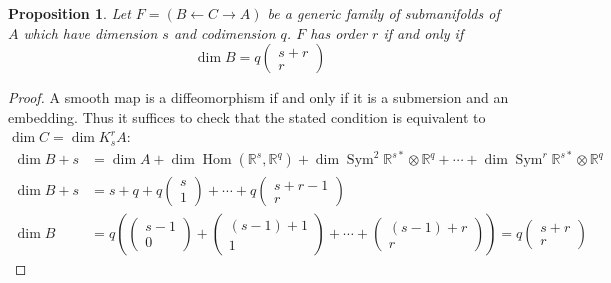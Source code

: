 \documentclass[12pt]{article}
\numberwithin{equation}{section}
\theoremstyle{plain}
\newtheorem{proposition}[definition]{Proposition}
\theoremstyle{definition}
\newcommand{\R}{\mathbb{R}}
\newcommand{\la}{\leftarrow}
\newcommand{\ra}{\rightarrow}
\begin{document}
\begin{proposition}\label{numericalcrit} Let $F=(B\la C\ra A)$ be a generic family of submanifolds of $A$ which have dimension $s$ and codimension $q$. $F$ has order $r$ if and only if
\[ \dim B = q\left(\begin{matrix}s + r \\ r\end{matrix}\right)\]
\end{proposition}

\begin{proof} A smooth map is a diffeomorphism if and only if it is a submersion and an embedding. Thus it suffices to check that the stated condition is equivalent to $\dim C = \dim K^{r}_{s}A$:
\begin{align*}
\dim B + s &= \dim A + \dim \operatorname{Hom}(\R^{s},\R^{q}) + \dim \operatorname{Sym}^{2}\R^{s*}\otimes \R^{q} + \cdots +\dim \operatorname{Sym}^{r}\R^{s*}\otimes \R^{q} \\
\dim B + s &= s + q + q\left( \begin{matrix}s \\ 1\end{matrix}\right)+ \cdots + q\left( \begin{matrix}s+r-1 \\ r\end{matrix}\right) \\
\dim B &= q\left(\left(\begin{matrix}s-1 \\ 0\end{matrix}\right) + \left(\begin{matrix}(s-1)+1 \\ 1\end{matrix}\right)+ \cdots + \left( \begin{matrix}(s-1)+r \\ r\end{matrix}\right)\right) = q\left(\begin{matrix}s + r \\ r\end{matrix}\right)
\end{align*}
\end{proof}
\end{document}
